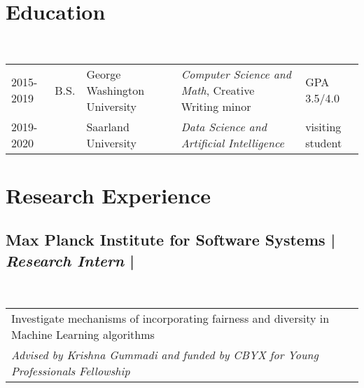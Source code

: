 \documentclass[a4paper,10pt]{article}
\begin{document}
\maketitle

\section{Education}

~\begin{tabular}{lllll}
2015-2019 & B.S. & George Washington University & \textit{Computer Science and Math}, Creative Writing minor & GPA 3.5/4.0\\
2019-2020 & \text{ } & Saarland University & \textit{Data Science and Artificial Intelligence} & visiting student
\end{tabular}


\section{Research Experience}


\subsection{Max Planck Institute for Software Systems | \emph{Research Intern} |  }
~\begin{tabular}{@{~$\bullet$~~}l}
Investigate mechanisms of incorporating fairness and diversity in Machine Learning algorithms \\
\textit{Advised by Krishna Gummadi and funded by CBYX for Young Professionals Fellowship}\\
\end{tabular}
\end{document}
